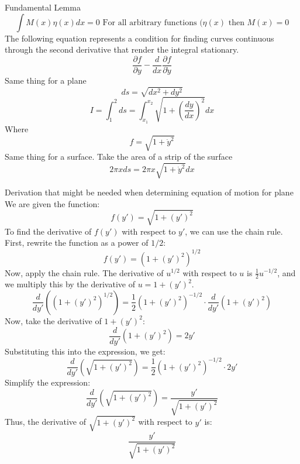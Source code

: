 \documentclass[12pt]{article}
\begin{document}
    Fundamental Lemma
    \begin{equation}
        \int M(x) \eta(x) dx = 0 \text{ For all arbitrary functions ($\eta(x)$ then } M(x) = 0
    \end{equation}
    The following equation represents a condition for finding curves continuous through the second derivative that render the integral stationary. 
    \begin{equation}
        \frac{\partial f}{\partial y} - \frac{d}{dx} \frac{\partial f}{\partial \dot{y}}
    \end{equation}
    Same thing for a plane
    \begin{equation}
        ds = \sqrt{dx^2 + dy^2}
    \end{equation}
    \begin{equation}
        I = \int_1^2 ds = \int_{x_1}^{x_2} \sqrt{1 + \left(\frac{dy}{dx} \right)^2} dx
    \end{equation}
    Where 
    \begin{equation}
        f = \sqrt{1 + \dot{y}^2}
    \end{equation}
    Same thing for a surface. Take the area of a strip of the surface 
    \begin{equation}
        2 \pi x ds = 2 \pi x \sqrt{1 + \dot{y}^2} dx
    \end{equation}

    Derivation that might be needed when determining equation of motion for plane
    We are given the function:
    \[
    f(y') = \sqrt{1 + (y')^2}
    \]
    To find the derivative of \( f(y') \) with respect to \( y' \), we can use the chain rule. 
    First, rewrite the function as a power of \( 1/2 \):
    \[
    f(y') = \left( 1 + (y')^2 \right)^{1/2}
    \]
    Now, apply the chain rule. The derivative of \( u^{1/2} \) with respect to \( u \) is \( \frac{1}{2} u^{-1/2} \), and we multiply this by the derivative of \( u = 1 + (y')^2 \).
    \[
    \frac{d}{dy'} \left( \left( 1 + (y')^2 \right)^{1/2} \right) = \frac{1}{2} \left( 1 + (y')^2 \right)^{-1/2} \cdot \frac{d}{dy'} \left( 1 + (y')^2 \right)
    \]
    Now, take the derivative of \( 1 + (y')^2 \):
    \[
    \frac{d}{dy'} \left( 1 + (y')^2 \right) = 2y'
    \]
    Substituting this into the expression, we get:
    \[
    \frac{d}{dy'} \left( \sqrt{1 + (y')^2} \right) = \frac{1}{2} \left( 1 + (y')^2 \right)^{-1/2} \cdot 2y'
    \]
    Simplify the expression:
    \[
    \frac{d}{dy'} \left( \sqrt{1 + (y')^2} \right) = \frac{y'}{\sqrt{1 + (y')^2}}
    \]
    Thus, the derivative of \( \sqrt{1 + (y')^2} \) with respect to \( y' \) is:
    \[
    \frac{y'}{\sqrt{1 + (y')^2}}
    \]
    
\end{document}
